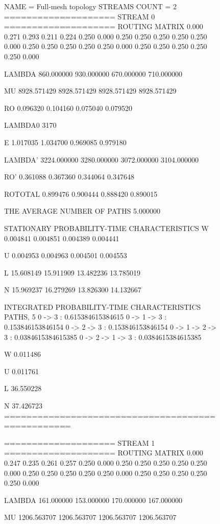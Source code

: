 \documentclass[oneside, final, 14pt, a4paper]{extreport}
\begin{document}
\begin{figure}[h!]
	\begin{listing}{1}
NAME = Full-mesh topology
STREAMS COUNT = 2
==================== STREAM 0 ====================
ROUTING MATRIX
0.000	0.271	0.293	0.211	0.224
0.250	0.000	0.250	0.250	0.250
0.250	0.250	0.000	0.250	0.250
0.250	0.250	0.250	0.000	0.250
0.250	0.250	0.250	0.250	0.000

LAMBDA
860.000000
930.000000
670.000000
710.000000

MU
8928.571429
8928.571429
8928.571429
8928.571429

RO
0.096320
0.104160
0.075040
0.079520

LAMBDA0
3170

E
1.017035
1.034700
0.969085
0.979180

LAMBDA'
3224.000000
3280.000000
3072.000000
3104.000000\end{listing}

	\label{pic:demo4_log_begin}
\end{figure}

\begin{figure}[h!]
	\begin{listing}{43}
RO'
0.361088
0.367360
0.344064
0.347648

ROTOTAL
0.899476
0.900444
0.888420
0.890015

THE AVERAGE NUMBER OF PATHS
5.000000

STATIONARY PROBABILITY-TIME CHARACTERISTICS
W
0.004841
0.004851
0.004389
0.004441

U
0.004953
0.004963
0.004501
0.004553

L
15.608149
15.911909
13.482236
13.785019

N
15.969237
16.279269
13.826300
14.132667\end{listing}
\end{figure}

\begin{figure}[h!]
	\begin{listing}{82}
INTEGRATED PROBABILITY-TIME CHARACTERISTICS
PATHS, 5
0 -> 3 : 0.615384615384615
0 -> 1 -> 3 : 0.153846153846154
0 -> 2 -> 3 : 0.153846153846154
0 -> 1 -> 2 -> 3 : 0.0384615384615385
0 -> 2 -> 1 -> 3 : 0.0384615384615385

W
0.011486

U
0.011761

L
36.550228

N
37.426723
==================================================

==================== STREAM 1 ====================
ROUTING MATRIX
0.000	0.247	0.235	0.261	0.257
0.250	0.000	0.250	0.250	0.250
0.250	0.250	0.000	0.250	0.250
0.250	0.250	0.250	0.000	0.250
0.250	0.250	0.250	0.250	0.000

LAMBDA
161.000000
153.000000
170.000000
167.000000

MU
1206.563707
1206.563707
1206.563707
1206.563707\end{listing}
\end{figure}
\end{document}
